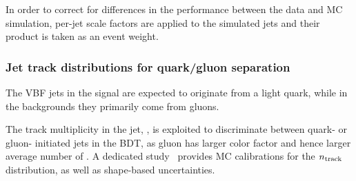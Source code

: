 
In order to correct for differences in the \btagging performance between the data and MC simulation, per-jet scale factors are applied to the simulated jets and their product is taken as an event weight.

\subsubsection{Jet track distributions for quark/gluon separation}
\label{sec:vbf-qgtagging}

The VBF jets in the signal are expected to originate from a light quark, 
while in the backgrounds they primarily come from gluons.

The track multiplicity in the jet, \ntrk, is exploited to discriminate between quark- or gluon- initiated jets in the BDT, as gluon has larger color factor and hence larger average number of \ntrk. A dedicated study~\cite{qgtagging}  provides MC calibrations for the $n_{\rm track}$ distribution, as well as shape-based uncertainties.


